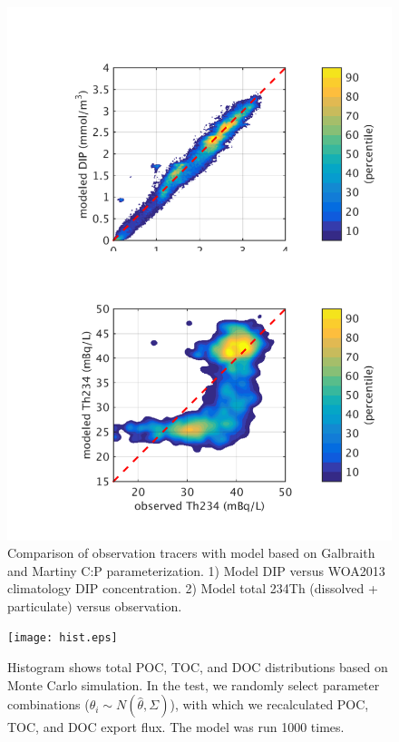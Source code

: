\clearpage
\begin{figure}[!htb]
\includegraphics[width=1.0\textwidth,center]{MvsO_GB15.pdf}
\caption{Comparison of observation tracers with model based on Galbraith and Martiny \cite{Galbraith2015} C:P parameterization.  1) Model DIP versus WOA2013 climatology DIP concentration. 2) Model total 234Th (dissolved + particulate) versus observation.}
\label{fig:MvsO_GB15}
\end{figure}


\clearpage
\begin{figure}[bp!]
\texttt{[image: hist.eps]}
\caption{Histogram shows total POC, TOC, and DOC distributions based on Monte Carlo simulation. In the test, we randomly select parameter combinations ($\theta_i \sim N(\hat{\theta},\Sigma)$), with which we recalculated POC, TOC, and DOC export flux. The model was run 1000 times.}
\label{fig:mc}
\end{figure}

